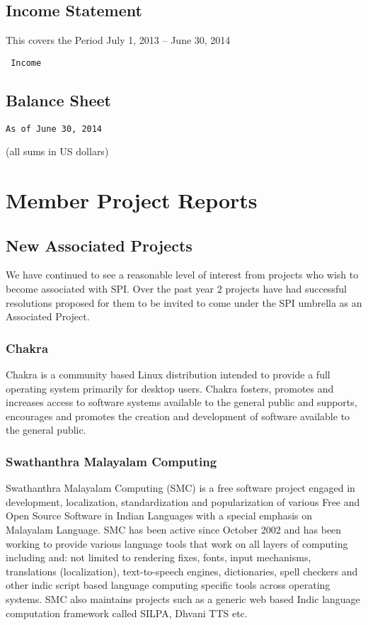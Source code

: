 \documentclass[letterpaper]{report}
\begin{document}
\section{Income Statement}

This covers the Period July 1, 2013 -- June 30, 2014

\begin{verbatim}
 Income
\end{verbatim}

\section{Balance Sheet}

\begin{verbatim}
As of June 30, 2014
\end{verbatim}

(all sums in US dollars)


\chapter{Member Project Reports}

\section{New Associated Projects}

We have continued to see a reasonable level of interest from projects who wish
to become associated with SPI. Over the past year 2 projects have had
successful resolutions proposed for them to be invited to come under the SPI
umbrella as an Associated Project.


\subsection{Chakra}

Chakra is a community based Linux distribution intended to provide a full
operating system primarily for desktop users.  Chakra fosters, promotes and
increases access to software systems available to the general public and
supports, encourages and promotes the creation and development of software
available to the general public.


\subsection{Swathanthra Malayalam Computing}

Swathanthra Malayalam Computing (SMC) is a free software project engaged
in development, localization, standardization and popularization of
various Free and Open Source Software in Indian Languages with a special
emphasis on Malayalam Language. SMC has been active since October 2002 and
has been working to provide various language tools that work on all layers
of computing including and: not limited to rendering fixes, fonts, input
mechanisms, translations (localization), text-to-speech engines,
dictionaries, spell checkers and other indic script based language
computing specific tools across operating systems. SMC also maintains
projects such as a generic web based Indic language computation framework
called SILPA, Dhvani TTS etc.
\end{document}
